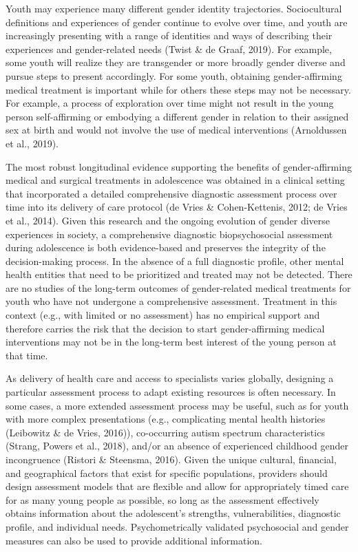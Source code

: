 \documentclass[
]{book}
\begin{document}
Youth may experience many different gender
identity trajectories. Sociocultural definitions and
experiences of gender continue to evolve over
time, and youth are increasingly presenting with
a range of identities and ways of describing their
experiences and gender-related needs (Twist \& de
Graaf, 2019). For example, some youth will realize
they are transgender or more broadly gender
diverse and pursue steps to present accordingly.
For some youth, obtaining gender-affirming medical treatment is important while for others these
steps may not be necessary. For example, a process
of exploration over time might not result in the
young person self-affirming or embodying a different gender in relation to their assigned sex at
birth and would not involve the use of medical
interventions (Arnoldussen et al., 2019).

The most robust longitudinal evidence supporting the benefits of gender-affirming medical and
surgical treatments in adolescence was obtained
in a clinical setting that incorporated a detailed
comprehensive diagnostic assessment process over
time into its delivery of care protocol (de Vries \&
Cohen-Kettenis, 2012; de Vries et al., 2014). Given
this research and the ongoing evolution of gender
diverse experiences in society, a comprehensive
diagnostic biopsychosocial assessment during adolescence is both evidence-based and preserves the
integrity of the decision-making process. In the
absence of a full diagnostic profile, other mental
health entities that need to be prioritized and
treated may not be detected. There are no studies
of the long-term outcomes of gender-related medical treatments for youth who have not undergone
a comprehensive assessment. Treatment in this
context (e.g., with limited or no assessment) has
no empirical support and therefore carries the risk
that the decision to start gender-affirming medical
interventions may not be in the long-term best
interest of the young person at that time.

As delivery of health care and access to specialists varies globally, designing a particular
assessment process to adapt existing resources is
often necessary. In some cases, a more extended
assessment process may be useful, such as for
youth with more complex presentations (e.g., complicating mental health histories (Leibowitz \& de
Vries, 2016)), co-occurring autism spectrum characteristics (Strang, Powers et al., 2018), and/or an
absence of experienced childhood gender incongruence (Ristori \& Steensma, 2016). Given the
unique cultural, financial, and geographical factors
that exist for specific populations, providers should
design assessment models that are flexible and
allow for appropriately timed care for as many
young people as possible, so long as the assessment effectively obtains information about the
adolescent's strengths, vulnerabilities, diagnostic
profile, and individual needs. Psychometrically validated psychosocial and gender measures can also
be used to provide additional information.
\end{document}
